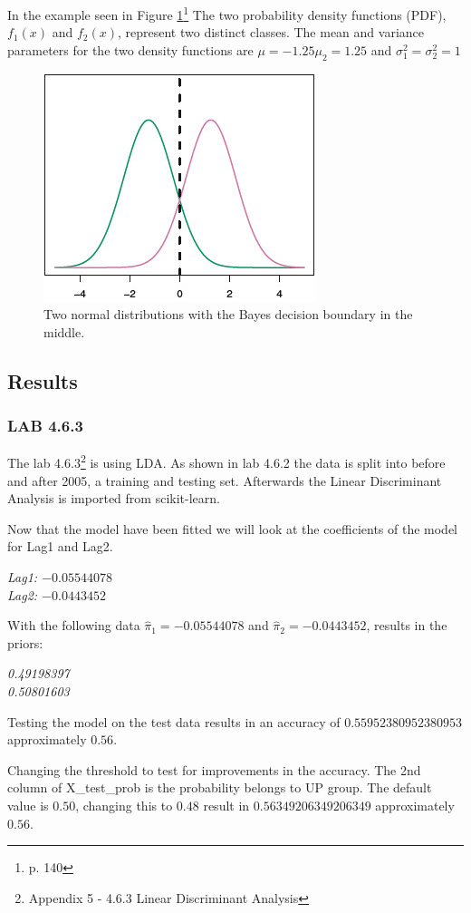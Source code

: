 In the example seen in Figure \ref{fig:TwoOneDimensionalNormalDensityFunctions}\footnote{\cite{James2013} p. 140} The two probability density functions (PDF), $f_1(x)$ and $f_2(x)$, represent two distinct classes. The mean and variance parameters for the two density functions are $\mu=-1.25 \mu_2=1.25$ and $\sigma^2_1=\sigma^2_2=1$
\begin{figure}[H]
	\centering
	\includegraphics[scale=2.0]{discriminantAnalysis/linearDiscriminantAnalysis/fig/TwoOneDimensionalNormalDensityFunctions.jpg}
	\caption{Two normal distributions with the Bayes decision boundary in the middle.}
	\label{fig:TwoOneDimensionalNormalDensityFunctions}
\end{figure}


\subsection{Results}
\subsubsection*{LAB 4.6.3}
The lab 4.6.3\footnote{Appendix 5 - 4.6.3 Linear Discriminant Analysis} is using LDA. As shown in lab 4.6.2 the data is split into before and after 2005, a training and testing set. Afterwards the Linear Discriminant Analysis is imported from scikit-learn.

Now that the model have been fitted we will look at the coefficients of the model for Lag1 and Lag2.

\noindent\textit{Lag1: $-0.05544078$\\
Lag2: $-0.0443452$}

With the following data $\hat{ \pi }_1 = -0.05544078$ and $\hat{ \pi }_2 = -0.0443452 $, results in the priors:%

\noindent\textit{0.49198397\\
0.50801603}

Testing the model on the test data results in an accuracy of $0.55952380952380953$ approximately $0.56$.

Changing the threshold to test for improvements in the accuracy. The 2nd column of X\_test\_prob is the probability belongs to UP group. The default value is $0.50$, changing this to $0.48$ result in $0.56349206349206349$ approximately $0.56$.
